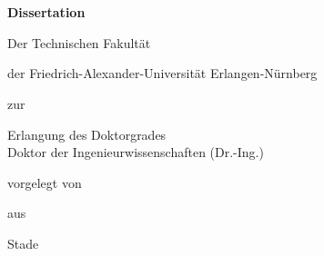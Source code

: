 \begin{titlepage}
    \begin{addmargin}[-1cm]{-3cm}
    \begin{center}
        \large

        \hfill

        \vfill

        \begingroup
            \color{CTtitle}\spacedallcaps{\myTitle} \\ \bigskip
            \color{CTtitle}\spacedallcaps{\myTitleGerman} \\ \bigskip
        \endgroup
        
        \medskip
        \vfill

        \large
        \textbf{Dissertation}\\ \medskip
        
        \vspace{5ex}

			Der Technischen Fakultät

			der Friedrich-Alexander-Universität Erlangen-Nürnberg


			zur

			Erlangung des Doktorgrades\\

			Doktor der Ingenieurwissenschaften (Dr.-Ing.)


			\vspace{5ex}

			vorgelegt von

			\myName

			aus

			Stade

        \vfill

    \end{center}
  \end{addmargin}
\end{titlepage}
